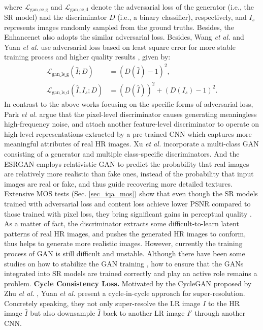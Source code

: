 {\begin{align}
\end{align}
where $\mathcal{L}_{\text{gan\_ce\_g}}$ and $\mathcal{L}_{\text{gan\_ce\_d}}$ denote the adversarial loss of the generator (i.e., the SR model) and the discriminator $D$ (i.e., a binary classifier), respectively, and $I_s$ represents images randomly sampled from the ground truths.
Besides, the Enhancenet  also adopts the similar adversarial loss.
Besides, Wang \textit{et al.}  and Yuan \textit{et al.}  use adversarial loss based on least square error for more stable training process and higher quality results , given by:
\begin{align}
    \mathcal{L}_{\text{gan\_ls\_g}} (\hat{I} ; D) &= (D(\hat{I}) - 1)^2 , \\
    \mathcal{L}_{\text{gan\_ls\_d}} (\hat{I}, I_s ; D) &= (D(\hat{I}))^2 + (D(I_s) - 1)^2 .
\end{align}
In contrast to the above works focusing on the specific forms of adversarial loss, Park \textit{et al.}  argue that the pixel-level discriminator causes generating meaningless high-frequency noise, and attach another feature-level discriminator to operate on high-level representations extracted by a pre-trained CNN which captures more meaningful attributes of real HR images.  
Xu \textit{et al.}  incorporate a multi-class GAN consisting of a generator and multiple class-specific discriminators.
And the ESRGAN  employs relativistic GAN  to predict the probability that real images are relatively more realistic than fake ones, instead of the probability that input images are real or fake, and thus guide recovering more detailed textures.
Extensive MOS tests (Sec. \ref{sec_iqa_mos}) show that even though the SR models trained with adversarial loss and content loss achieve lower PSNR compared to those trained with pixel loss, they bring significant gains in perceptual quality .
As a matter of fact, the discriminator extracts some difficult-to-learn latent patterns of real HR images, and pushes the generated HR images to conform, thus helps to generate more realistic images.
However, currently the training process of GAN is still difficult and unstable.
Although there have been some studies on how to stabilize the GAN training , how to ensure that the GANs integrated into SR models are trained correctly and play an active role remains a problem.
\textbf{Cycle Consistency Loss.}
Motivated by the CycleGAN proposed by Zhu \textit{et al.} , Yuan \textit{et al.}  present a cycle-in-cycle approach for super-resolution.  
Concretely speaking, they not only super-resolve the LR image $I$ to the HR image $\hat{I}$ but also downsample $\hat{I}$ back to another LR image $I'$ through another CNN.
}
